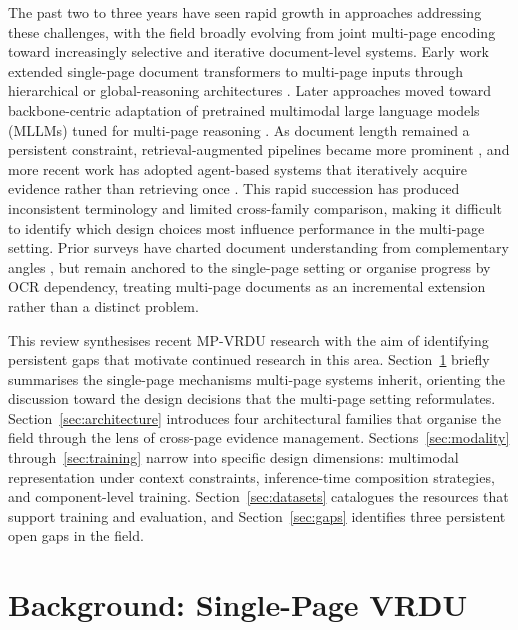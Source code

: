 \documentclass[11pt]{article}
\begin{document}
The past two to three years have seen rapid growth in approaches addressing these challenges, with the field broadly evolving from joint multi-page encoding toward increasingly selective and iterative document-level systems. Early work extended single-page document transformers to multi-page inputs through hierarchical or global-reasoning architectures \cite{tito2023hierarchical,blau2024gram}. Later approaches moved toward backbone-centric adaptation of pretrained multimodal large language models (MLLMs) tuned for multi-page reasoning \cite{duan2025docopilot,hu2025mplugdocowl2}. As document length remained a persistent constraint, retrieval-augmented pipelines became more prominent \cite{cho2024m3docrag,tanaka2025vdocrag}, and more recent work has adopted agent-based systems that iteratively acquire evidence rather than retrieving once \cite{sun2025docagent,wang2025vidorag}. This rapid succession has produced inconsistent terminology and limited cross-family comparison, making it difficult to identify which design choices most influence performance in the multi-page setting. Prior surveys have charted document understanding from complementary angles \cite{subramani2020survey,ding2026deep,gbada2025deep,ding2025survey,gao2025scaling}, but remain anchored to the single-page setting or organise progress by OCR dependency, treating multi-page documents as an incremental extension rather than a distinct problem.

This review synthesises recent MP-VRDU research with the aim of identifying persistent gaps that motivate continued research in this area. Section~\ref{sec:background} briefly summarises the single-page mechanisms multi-page systems inherit, orienting the discussion toward the design decisions that the multi-page setting reformulates. Section~\ref{sec:architecture} introduces four architectural families that organise the field through the lens of cross-page evidence management. Sections~\ref{sec:modality} through~\ref{sec:training} narrow into specific design dimensions: multimodal representation under context constraints, inference-time composition strategies, and component-level training. Section~\ref{sec:datasets} catalogues the resources that support training and evaluation, and Section~\ref{sec:gaps} identifies three persistent open gaps in the field.

\section{Background: Single-Page VRDU}
\label{sec:background}
\end{document}
